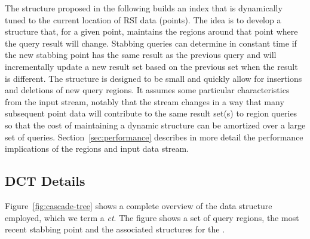 \documentclass{stdbm}
\newcommand{\ct}{\id{DCT}}
\begin{document}
The structure proposed in the following builds an index that is
dynamically tuned to the current location of RSI data (points).  The
idea is to develop a structure that, for a given point, maintains the
regions around that point where the query result will change.
Stabbing queries can determine in constant time if the new stabbing
point has the same result as the previous query and will incrementally
update a new result set based on the previous set when the result is
different.  The structure is designed to be small and quickly allow
for insertions and deletions of new query regions.  It assumes some
particular characteristics from the input stream, notably that the
stream changes in a way that many subsequent point data will
contribute to the same result set(s) to region queries so that the
cost of maintaining a dynamic structure can be amortized over a large
set of queries.  Section~\ref{sec:performance} describes in more
detail the performance implications of the regions and input data
stream.

\vspace*{-1.5ex}
\subsection{DCT Details}

Figure~\ref{fig:cascade-tree} shows a complete overview of the data
structure employed, which we term a \emph{\acf{ct}}.  The figure shows
a set of query regions, the most recent stabbing point and the
associated structures for the \ct.

\begin{figure*}[htbp]
  \centering
  
  \caption{The Dynamic Cascade Tree (DCT)}
  \label{fig:cascade-tree}
\end{figure*}
\end{document}
